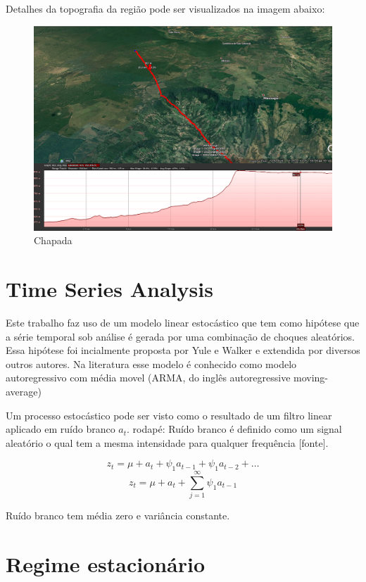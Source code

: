 \documentclass[
	12pt,				%
	openright,			%
	oneside,			%
	a4paper,			%
	english,			%
	french,				%
	spanish,			%
	brazil				%
	]{abntex2}
\begin{document}
Detalhes da topografia da região pode ser visualizados na imagem abaixo:

\begin{figure}[h]
    \centering
	\includegraphics[width=\textwidth]{elevation2}
	\caption{Chapada}
\end{figure}
\FloatBarrier


\chapter{Time Series Analysis}

Este trabalho faz uso de um modelo linear estocástico que tem como hipótese que a série temporal sob análise é gerada por uma combinação de choques aleatórios. Essa hipótese foi incialmente proposta por Yule e Walker e extendida por diversos outros autores.
Na literatura esse modelo é conhecido como modelo autoregressivo com média movel (ARMA, do inglês autoregressive moving-average)

Um processo estocástico pode ser visto como o resultado de um filtro linear aplicado em ruído branco $a_t$. 
rodapé: Ruído branco é definido como um signal aleatório o qual tem a mesma intensidade para qualquer frequência [fonte].

$$ z_t = \mu + a_t + \psi_1a_{t-1} + \psi_1a_{t-2} + \dots $$
$$ z_t = \mu + a_t + \sum_{j=1}^{\infty}\psi_1a_{t-1} $$

Ruído branco tem média zero e variância constante. 

\chapter{Regime estacionário}
\end{document}
